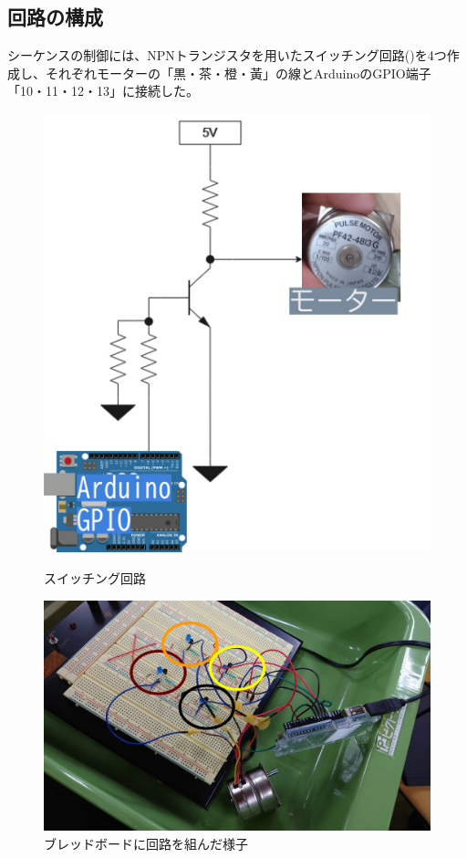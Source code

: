 \documentclass[../../main]{subfiles}
\begin{document}
\subsection{回路の構成}
シーケンスの制御には、NPNトランジスタを用いたスイッチング回路()を4つ作成し、それぞれモーターの「黒・茶・橙・黃」の線とArduinoのGPIO端子「10・11・12・13」に接続した。
\begin{figure}[H]
  \centering
  \begin{minipage}{0.4\columnwidth}
    \centering
    \includegraphics[width=\columnwidth]{circuit.png}
    \caption{スイッチング回路}
    \label{fig:circuit}
  \end{minipage}
  \begin{minipage}{0.4\columnwidth}
  \centering
    \includegraphics[width=\columnwidth]{bread-board.png}
    \caption{ブレッドボードに回路を組んだ様子}
    \label{fig:bread-board}
  \end{minipage}
\end{figure}
\end{document}
